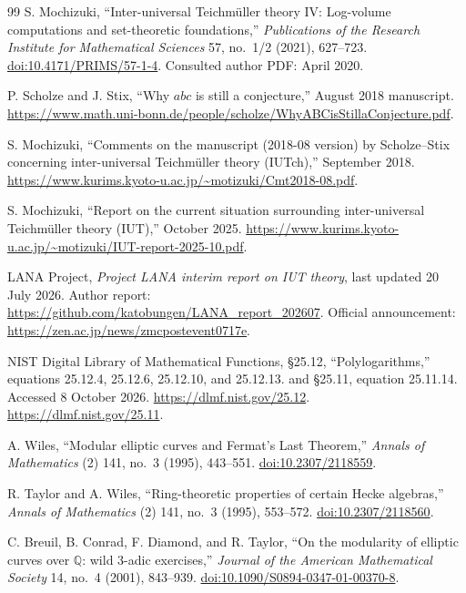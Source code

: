\begin{thebibliography}{99}
S. Mochizuki,
``Inter-universal Teichm\"uller theory IV: Log-volume computations and set-theoretic foundations,''
\emph{Publications of the Research Institute for Mathematical Sciences}
57, no.~1/2 (2021), 627--723.
\href{https://doi.org/10.4171/PRIMS/57-1-4}{doi:10.4171/PRIMS/57-1-4}.
Consulted author PDF: April 2020.

P. Scholze and J. Stix,
``Why $abc$ is still a conjecture,'' August 2018 manuscript.
\url{https://www.math.uni-bonn.de/people/scholze/WhyABCisStillaConjecture.pdf}.

S. Mochizuki,
``Comments on the manuscript (2018-08 version) by Scholze--Stix concerning inter-universal Teichm\"uller theory (IUTch),'' September 2018.
\url{https://www.kurims.kyoto-u.ac.jp/~motizuki/Cmt2018-08.pdf}.

S. Mochizuki,
``Report on the current situation surrounding inter-universal Teichm\"uller theory (IUT),'' October 2025.
\url{https://www.kurims.kyoto-u.ac.jp/~motizuki/IUT-report-2025-10.pdf}.

LANA Project,
\emph{Project LANA interim report on IUT theory}, last updated 20 July 2026.
Author report: \url{https://github.com/katobungen/LANA_report_202607}.
Official announcement: \url{https://zen.ac.jp/news/zmcpostevent0717e}.

NIST Digital Library of Mathematical Functions,
\S25.12, ``Polylogarithms,'' equations 25.12.4, 25.12.6, 25.12.10, and 25.12.13.
and \S25.11, equation 25.11.14. Accessed 8 October 2026.
\url{https://dlmf.nist.gov/25.12}. \url{https://dlmf.nist.gov/25.11}.

A. Wiles,
``Modular elliptic curves and Fermat's Last Theorem,''
\emph{Annals of Mathematics} (2) 141, no.~3 (1995), 443--551.
\href{https://doi.org/10.2307/2118559}{doi:10.2307/2118559}.

R. Taylor and A. Wiles,
``Ring-theoretic properties of certain Hecke algebras,''
\emph{Annals of Mathematics} (2) 141, no.~3 (1995), 553--572.
\href{https://doi.org/10.2307/2118560}{doi:10.2307/2118560}.

C. Breuil, B. Conrad, F. Diamond, and R. Taylor,
``On the modularity of elliptic curves over $\mathbb Q$: wild 3-adic exercises,''
\emph{Journal of the American Mathematical Society} 14, no.~4 (2001), 843--939.
\href{https://doi.org/10.1090/S0894-0347-01-00370-8}{doi:10.1090/S0894-0347-01-00370-8}.


\end{thebibliography}
